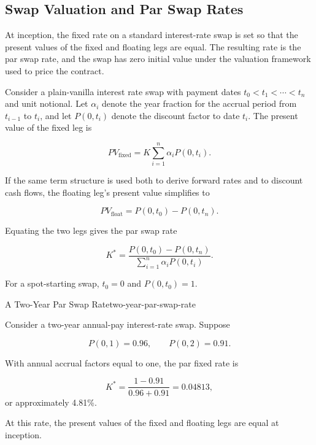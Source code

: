 \subsection{Swap Valuation and Par Swap Rates}

At inception, the fixed rate on a standard interest-rate swap is set so that the present values of the fixed and floating legs are equal. The resulting rate is the par swap rate, and the swap has zero initial value under the valuation framework used to price the contract.

Consider a plain-vanilla interest rate swap with payment
dates $t_0<t_1<\cdots<t_n$ and unit notional. Let
$\alpha_i$ denote the year fraction for the accrual period
from $t_{i-1}$ to $t_i$, and let $P(0,t_i)$ denote the
discount factor to date $t_i$. The present value of the
fixed leg is

\begin{equation}
PV_{\text{fixed}}
=
K
\sum_{i=1}^{n}
\alpha_i P(0,t_i).
\label{eq:ch17-fixed-leg-pv}
\end{equation}

If the same term structure is used both to derive forward
rates and to discount cash flows, the floating leg's
present value simplifies to

\begin{equation}
PV_{\text{float}}
=
P(0,t_0)-P(0,t_n).
\label{eq:ch17-floating-leg-pv}
\end{equation}

Equating the two legs gives the par swap rate

\begin{equation}
K^{*}
=
\frac{
P(0,t_0)-P(0,t_n)
}{
\sum_{i=1}^{n}
\alpha_i P(0,t_i)
}.
\label{eq:ch17-par-swap-rate}
\end{equation}

For a spot-starting swap, $t_0=0$ and $P(0,t_0)=1$.

\begin{example}{A Two-Year Par Swap Rate}{two-year-par-swap-rate}

Consider a two-year annual-pay interest-rate swap. Suppose

\[
P(0,1)=0.96,
\qquad
P(0,2)=0.91.
\]

With annual accrual factors equal to one, the par fixed rate is

\[
K^{*}
=
\frac{1-0.91}{0.96+0.91}
=
0.04813,
\]
or approximately 4.81\%.

At this rate, the present values of the fixed and floating legs are equal at inception.

\end{example}

